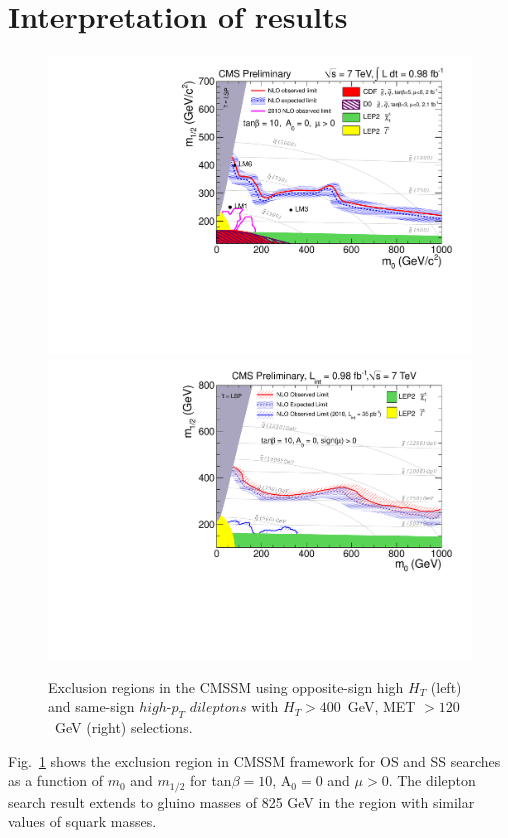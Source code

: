 \documentclass{PoS}
\begin{document}
\section{Interpretation of results}
\begin{figure}[htb]
\begin{center}
\includegraphics[width=0.48\linewidth, height=0.33\linewidth]{os1.pdf}
\includegraphics[width=0.48\linewidth, height=0.33\linewidth]{ss1.pdf}
\end{center}
\caption{Exclusion regions in the CMSSM using opposite-sign high $H_T$ (left) and same-sign $high$-$p_T$ $dileptons$ with $H_T > 400$~GeV, MET $> 120$~GeV (right) selections.}
\label{fig:msugraplot}
\end{figure}
Fig.~\ref{fig:msugraplot} shows the exclusion region in CMSSM framework for OS and SS searches as a function of $m_0$ and $m_{1/2}$ for tan$\beta = 10$, 
A$_0 = 0$ and $\mu > 0$. The dilepton search result extends to gluino masses of 825 GeV in the region with similar values of squark masses. 
\end{document}
